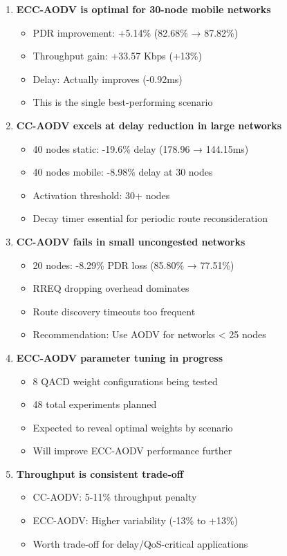 \documentclass[12pt]{article}
\begin{document}
\begin{enumerate}
    \item \textbf{ECC-AODV is optimal for 30-node mobile networks}
    \begin{itemize}
        \item PDR improvement: +5.14\% (82.68\% → 87.82\%)
        \item Throughput gain: +33.57 Kbps (+13\%)
        \item Delay: Actually improves (-0.92ms)
        \item This is the single best-performing scenario
    \end{itemize}

    \item \textbf{CC-AODV excels at delay reduction in large networks}
    \begin{itemize}
        \item 40 nodes static: -19.6\% delay (178.96 → 144.15ms)
        \item 40 nodes mobile: -8.98\% delay at 30 nodes
        \item Activation threshold: 30+ nodes
        \item Decay timer essential for periodic route reconsideration
    \end{itemize}

    \item \textbf{CC-AODV fails in small uncongested networks}
    \begin{itemize}
        \item 20 nodes: -8.29\% PDR loss (85.80\% → 77.51\%)
        \item RREQ dropping overhead dominates
        \item Route discovery timeouts too frequent
        \item Recommendation: Use AODV for networks < 25 nodes
    \end{itemize}

    \item \textbf{ECC-AODV parameter tuning in progress}
    \begin{itemize}
        \item 8 QACD weight configurations being tested
        \item 48 total experiments planned
        \item Expected to reveal optimal weights by scenario
        \item Will improve ECC-AODV performance further
    \end{itemize}

    \item \textbf{Throughput is consistent trade-off}
    \begin{itemize}
        \item CC-AODV: 5-11\% throughput penalty
        \item ECC-AODV: Higher variability (-13\% to +13\%)
        \item Worth trade-off for delay/QoS-critical applications
    \end{itemize}
\end{enumerate}
\end{document}
